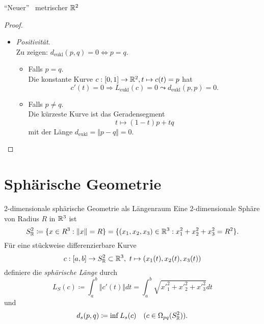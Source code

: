 \begin{theorem}{``Neuer'' \ metrischer $ \mathbb{R}^2 $}
\begin{proof}
\begin{itemize}
      \item \emph{Positivität}. \\
        Zu zeigen: $ d_\text{eukl}(p,q) = 0 \Leftrightarrow p = q $.
        \begin{itemize}
          \item Falls $ p = q $. \\
            Die konstante Kurve $ c: [0,1] \to \mathbb{R}^2, t \mapsto c(t) = p $ hat 
            \begin{equation*}
              c'(t) = 0 \Rightarrow L_\text{eukl}(c) = 0 \leadsto d_\text{eukl}(p,p) = 0 \text{.}
            \end{equation*}
          \item Falls $ p \neq q $. \\
            Die kürzeste Kurve ist das Geradensegment
            \begin{equation*}
              t \mapsto (1-t)p + tq
            \end{equation*}
            mit der Länge $ d_\text{eukl} = \Vert p - q \Vert = 0 $.
        \end{itemize}
    \end{itemize}
  \end{proof}
\end{theorem}

\section{Sphärische Geometrie}
\begin{example}{2-dimensionale sphärische Geometrie als Längenraum}
  Eine $ 2 $-dimensionale Sphäre von Radius $ R $ in $ \mathbb{R}^3 $ ist
  \begin{equation*}
    S^2_{\mathbb{R}} \coloneqq \{ x \in R^3 : \Vert x \Vert = R \} = \{ (x_1, x_2, x_3) \in \mathbb{R}^3 : x_1^2+x_2^2+x_3^2 = R^2 \}\text{.}
  \end{equation*}
  Für eine stückweise differenzierbare Kurve
  \begin{equation*}
    c: [a,b] \to S^2_{\mathbb{R}} \subset \mathbb{R}^3, \ t \mapsto (x_1(t), x_2(t), x_3(t))
  \end{equation*}
  definiere die \emph{sphärische Länge} durch
  \begin{equation*}
    L_S(c) \coloneqq \int_a^b \Vert c'(t) \Vert dt = \int_a^b \sqrt{{x'}_1^2+{x'}_2^2+{x'}_3^2}dt
  \end{equation*}
  und
  \begin{equation*}
    d_s(p,q) \coloneqq \inf L_s(c) \quad (c \in \Omega_{pq}(S^2_{\mathbb{R}}))\text{.}
  \end{equation*}
\end{example}

